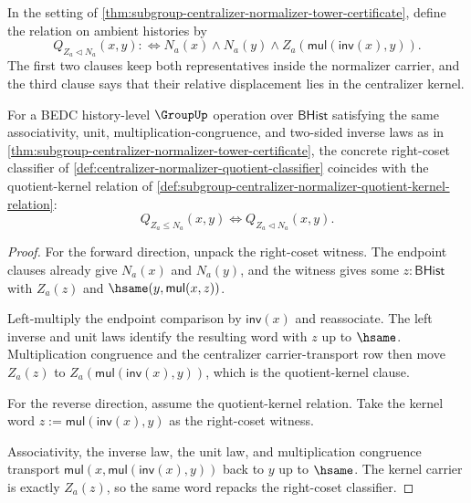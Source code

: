 
\begin{definition}
\label{def:subgroup-centralizer-normalizer-quotient-kernel-relation}
In the setting of
\autoref{thm:subgroup-centralizer-normalizer-tower-certificate}, define the
relation on ambient histories by
$$
Q_{Z_a\triangleleft N_a}(x,y) :\Longleftrightarrow
N_a(x)\land N_a(y)\land
Z_a(\mathsf{mul}(\mathsf{inv}(x),y)).
$$
The first two clauses keep both representatives inside the normalizer carrier,
and the third clause says that their relative displacement lies in the
centralizer kernel.
\end{definition}

\begin{theorem}
\label{thm:subgroup-centralizer-right-coset-quotient-kernel-iff}
For a BEDC history-level $\GroupUp$ operation over $\mathsf{BHist}$
satisfying the same associativity, unit, multiplication-congruence, and
two-sided inverse laws as in
\autoref{thm:subgroup-centralizer-normalizer-tower-certificate}, the concrete
right-coset classifier of
\autoref{def:centralizer-normalizer-quotient-classifier} coincides with the
quotient-kernel relation of
\autoref{def:subgroup-centralizer-normalizer-quotient-kernel-relation}:
$$
Q_{Z_a\leq N_a}(x,y)\Longleftrightarrow
Q_{Z_a\triangleleft N_a}(x,y).
$$
\end{theorem}
\begin{proof}
For the forward direction, unpack the right-coset witness. The endpoint
clauses already give $N_a(x)$ and $N_a(y)$, and the witness gives some
$z:\mathsf{BHist}$ with $Z_a(z)$ and
$\hsame(y,\mathsf{mul}(x,z))$.

Left-multiply the endpoint comparison by $\mathsf{inv}(x)$ and reassociate.
The left inverse and unit laws identify the resulting word with $z$ up to
$\hsame$. Multiplication congruence and the centralizer carrier-transport row
then move $Z_a(z)$ to
$Z_a(\mathsf{mul}(\mathsf{inv}(x),y))$, which is the quotient-kernel clause.

For the reverse direction, assume the quotient-kernel relation. Take the
kernel word $z:=\mathsf{mul}(\mathsf{inv}(x),y)$ as the right-coset witness.

Associativity, the inverse law, the unit law, and multiplication congruence
transport $\mathsf{mul}(x,\mathsf{mul}(\mathsf{inv}(x),y))$ back to $y$ up
to $\hsame$. The kernel carrier is exactly $Z_a(z)$, so the same word repacks
the right-coset classifier.
\end{proof}

